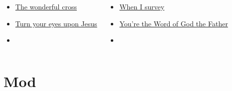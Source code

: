 \documentclass[aspectratio=169]{beamer}
\begin{document}
\begin{frame}[t]
\begin{columns}[t]
\begin{itemize}
    \item \hyperlink{The wonderful cross['When I survey'](Tomlin)}{The wonderful cross}

    \item \hyperlink{Turn your eyes upon Jesus[]}{Turn your eyes upon Jesus}

    \item[] \phantom{1}
\end{itemize}
\begin{itemize}
    \item \hyperlink{The wonderful cross['When I survey'](Tomlin)}{When I survey}

    \item \hyperlink{Across the lands["You're the Word of God the Father"](Townend)}{You're the Word of God the Father}

    \item[] \phantom{1}
\end{itemize}
\end{columns}
\end{frame}

\section{ Mod }
\end{document}
